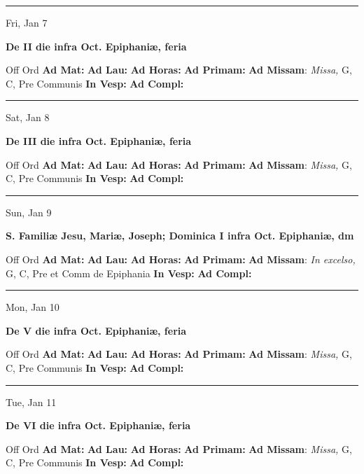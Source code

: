 \documentclass[letterpaper, 10pt]{article}
\begin{document}
\hrule
\begin{center}
Fri, Jan 7
\end{center}\textbf{ \large De II die infra Oct. Epiphaniæ, \textnormal{\normalsize feria}}
\begin{justify}
Off Ord
\textbf{Ad Mat: }
\textbf{Ad Lau: }
\textbf{Ad Horas: }
\textbf{Ad Primam: }
\textbf{Ad Missam}: \textit{Missa,} G, C, Pre Communis
\textbf{In Vesp: }
\textbf{Ad Compl: }\end{justify}



\hrule
\begin{center}
Sat, Jan 8
\end{center}\textbf{ \large De III die infra Oct. Epiphaniæ, \textnormal{\normalsize feria}}
\begin{justify}
Off Ord
\textbf{Ad Mat: }
\textbf{Ad Lau: }
\textbf{Ad Horas: }
\textbf{Ad Primam: }
\textbf{Ad Missam}: \textit{Missa,} G, C, Pre Communis
\textbf{In Vesp: }
\textbf{Ad Compl: }\end{justify}



\hrule
\begin{center}
Sun, Jan 9
\end{center}\textbf{ \large S. Familiæ Jesu, Mariæ, Joseph; Dominica I infra Oct. Epiphaniæ, \textnormal{\normalsize dm}}
\begin{justify}
Off Ord
\textbf{Ad Mat: }
\textbf{Ad Lau: }
\textbf{Ad Horas: }
\textbf{Ad Primam: }
\textbf{Ad Missam}: \textit{In excelso,} G, C, Pre et Comm de Epiphania
\textbf{In Vesp: }
\textbf{Ad Compl: }\end{justify}



\hrule
\begin{center}
Mon, Jan 10
\end{center}\textbf{ \large De V die infra Oct. Epiphaniæ, \textnormal{\normalsize feria}}
\begin{justify}
Off Ord
\textbf{Ad Mat: }
\textbf{Ad Lau: }
\textbf{Ad Horas: }
\textbf{Ad Primam: }
\textbf{Ad Missam}: \textit{Missa,} G, C, Pre Communis
\textbf{In Vesp: }
\textbf{Ad Compl: }\end{justify}



\hrule
\begin{center}
Tue, Jan 11
\end{center}\textbf{ \large De VI die infra Oct. Epiphaniæ, \textnormal{\normalsize feria}}
\begin{justify}
Off Ord
\textbf{Ad Mat: }
\textbf{Ad Lau: }
\textbf{Ad Horas: }
\textbf{Ad Primam: }
\textbf{Ad Missam}: \textit{Missa,} G, C, Pre Communis
\textbf{In Vesp: }
\textbf{Ad Compl: }\end{justify}
\end{document}
